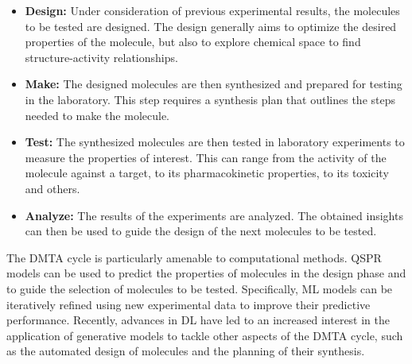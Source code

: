 \begin{itemize}
      \item \textbf{Design:} Under consideration of previous experimental results, the molecules to
            be tested are designed. The design generally aims to optimize the desired properties of
            the molecule, but also to explore chemical space to find structure-activity relationships.
      \item \textbf{Make:} The designed molecules are then synthesized and prepared for testing in
            the laboratory. This step requires a synthesis plan that outlines the steps needed to
            make the molecule.
      \item \textbf{Test:} The synthesized molecules are then tested in laboratory experiments to
            measure the properties of interest. This can range from the activity of the molecule
            against a target, to its pharmacokinetic properties, to its toxicity and others.
      \item \textbf{Analyze:} The results of the experiments are analyzed. The obtained insights
            can then be used to guide the design of the next molecules to be tested.
\end{itemize}

The \ac{DMTA} cycle is particularly amenable to computational methods. \ac{QSPR} models can be used
to predict the properties of molecules in the design phase and to guide the selection of molecules
to be tested. Specifically, \ac{ML} models can be iteratively refined using new experimental data to
improve their predictive performance. Recently, advances in \ac{DL} have led to an increased
interest in the application of generative models to tackle other aspects of the \ac{DMTA} cycle,
such as the automated design of molecules and the planning of their synthesis.

